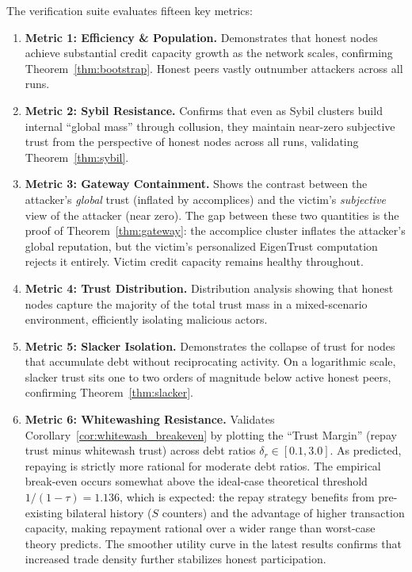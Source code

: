 \documentclass[11pt]{article}
\begin{document}
The verification suite evaluates fifteen key metrics:

\begin{enumerate}
    \item \textbf{Metric 1: Efficiency \& Population.} Demonstrates that honest nodes achieve substantial credit capacity growth as the network scales, confirming Theorem~\ref{thm:bootstrap}. Honest peers vastly outnumber attackers across all runs.
    \item \textbf{Metric 2: Sybil Resistance.} Confirms that even as Sybil clusters build internal ``global mass'' through collusion, they maintain near-zero subjective trust from the perspective of honest nodes across all runs, validating Theorem~\ref{thm:sybil}.
    \item \textbf{Metric 3: Gateway Containment.} Shows the contrast between the attacker's \emph{global} trust (inflated by accomplices) and the victim's \emph{subjective} view of the attacker (near zero). The gap between these two quantities is the proof of Theorem~\ref{thm:gateway}: the accomplice cluster inflates the attacker's global reputation, but the victim's personalized EigenTrust computation rejects it entirely. Victim credit capacity remains healthy throughout.
    \item \textbf{Metric 4: Trust Distribution.} Distribution analysis showing that honest nodes capture the majority of the total trust mass in a mixed-scenario environment, efficiently isolating malicious actors.
    \item \textbf{Metric 5: Slacker Isolation.} Demonstrates the collapse of trust for nodes that accumulate debt without reciprocating activity. On a logarithmic scale, slacker trust sits one to two orders of magnitude below active honest peers, confirming Theorem~\ref{thm:slacker}.
    \item \textbf{Metric 6: Whitewashing Resistance.} Validates Corollary~\ref{cor:whitewash_breakeven} by plotting the ``Trust Margin'' (repay trust minus whitewash trust) across debt ratios $\delta_r \in [0.1, 3.0]$. As predicted, repaying is strictly more rational for moderate debt ratios. The empirical break-even occurs somewhat above the ideal-case theoretical threshold $1/(1-\tau) = 1.136$, which is expected: the repay strategy benefits from pre-existing bilateral history ($S$ counters) and the advantage of higher transaction capacity, making repayment rational over a wider range than worst-case theory predicts. The smoother utility curve in the latest results confirms that increased trade density further stabilizes honest participation.

\end{enumerate}
\end{document}
